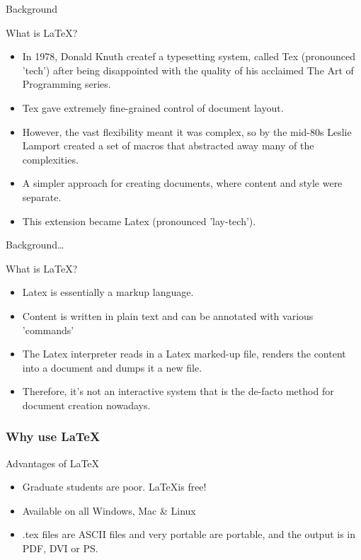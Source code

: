 
\begin{frame}{Background}
\begin{block}{What is \LaTeX?}
\begin{itemize}%
\item In 1978, Donald Knuth createf a typesetting system, called Tex (pronounced 'tech') after being disappointed with the quality of his acclaimed The Art of Programming series.

\item Tex gave extremely fine-grained control of document layout. 
\item However, the vast flexibility meant it was complex, so by the mid-80s Leslie Lamport created a set of macros that abstracted away many of the complexities.
\item A simpler approach for creating documents, where content and style were separate. 
\item This extension became Latex (pronounced 'lay-tech').
\end{itemize}
\end{block}
\end{frame}

\begin{frame}{Background\ldots}
\begin{block}{What is \LaTeX?}
\begin{itemize}%
\item Latex is essentially a markup language. 
\item Content is written in plain text and can be annotated with various 'commands' 
\item The Latex interpreter reads in a Latex marked-up file, renders the content into a document and dumps it a new file. 
\item Therefore, it's not an interactive system that is the de-facto method for document creation nowadays.
\end{itemize}
\end{block}
\end{frame}

\begin{frame}
\frametitle{Why use \LaTeX}
   
\begin{block}{Advantages of \LaTeX}
\begin{itemize}
\item Graduate students are poor.  \LaTeX is free!
\item Available on all Windows, Mac \& Linux
\item .tex files are ASCII files and very portable are portable, and the output is in PDF, DVI or PS.
\end{itemize}
\end{block}
\end{frame}

